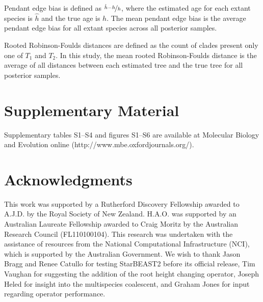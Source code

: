 \documentclass[nogrid]{MBE}%
\begin{document}
Pendant edge bias is defined as $\nicefrac{\hat{h} - h}{h}$, where the estimated
age for each extant species is $\hat{h}$ and the true age is $h$. The mean
pendant edge bias is the average pendant edge bias for all extant species across
all posterior samples.

Rooted Robinson-Foulds distances \citep{ROBINSON1981131} are defined as the
count of clades present only one of $T_1$ and $T_2$. In this study, the mean
rooted Robinson-Foulds distance is the average of all distances between each
estimated tree and the true tree for all posterior samples.

\section{Supplementary Material}
Supplementary tables S1--S4 and figures S1--S6 are available at Molecular Biology and Evolution
online (http://www.mbe.oxfordjournals.org/).

\section{Acknowledgments}

This work was supported by a Rutherford Discovery Fellowship awarded to A.J.D. by
the Royal Society of New Zealand. H.A.O. was supported by an Australian Laureate
Fellowship awarded to Craig Moritz by the Australian Research Council
(FL110100104). This research was undertaken with the assistance of resources
from the National Computational Infrastructure (NCI), which is supported by the
Australian Government. We wish to thank Jason Bragg and Renee Catullo for
testing StarBEAST2 before its official release, Tim Vaughan for suggesting the
addition of the root height changing operator, Joseph Heled for insight into the
multispecies coalescent, and Graham Jones for input regarding operator
performance.

\end{document}
